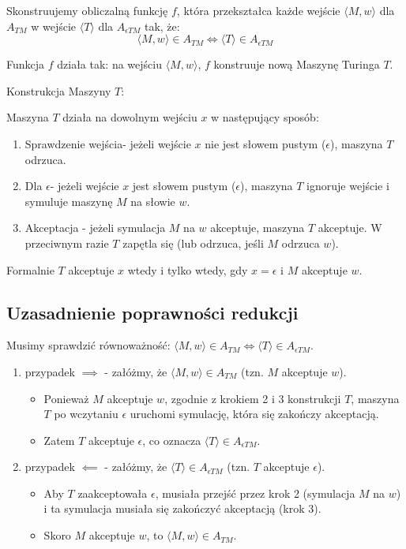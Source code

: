 \documentclass{article}
\begin{document}
Skonstruujemy obliczalną funkcję $f$, która przekształca każde wejście $\langle M, w \rangle$ dla $A_{TM}$ w wejście $\langle T \rangle$ dla $A_{\epsilon TM}$ tak, że:
$$
\langle M, w \rangle \in A_{TM} \iff \langle T \rangle \in A_{\epsilon TM}
$$

Funkcja $f$ działa tak: na wejściu $\langle M, w \rangle$, $f$ konstruuje nową Maszynę Turinga $T$.

Konstrukcja Maszyny $T$:

Maszyna $T$ działa na dowolnym wejściu $x$ w następujący sposób:
\begin{enumerate}
    \item Sprawdzenie wejścia- jeżeli wejście $x$ nie jest słowem pustym ($\epsilon$), maszyna $T$ odrzuca.
    \item Dla $\epsilon$- jeżeli wejście $x$ jest słowem pustym ($\epsilon$), maszyna $T$ ignoruje wejście i symuluje maszynę $M$ na słowie $w$.
    \item Akceptacja - jeżeli symulacja $M$ na $w$ akceptuje, maszyna $T$ akceptuje. W przeciwnym razie $T$ zapętla się (lub odrzuca, jeśli $M$ odrzuca $w$).
\end{enumerate}
Formalnie $T$ akceptuje $x$ wtedy i tylko wtedy, gdy $x=\epsilon$ i $M$ akceptuje $w$.

\subsection*{Uzasadnienie poprawności redukcji}

Musimy sprawdzić równoważność: $\langle M, w \rangle \in A_{TM} \iff \langle T \rangle \in A_{\epsilon TM}$.

\begin{enumerate}
    \item przypadek $\implies$ - załóżmy, że $\langle M, w \rangle \in A_{TM}$ (tzn. $M$ akceptuje $w$).
    \begin{itemize}
        \item Ponieważ $M$ akceptuje $w$, zgodnie z krokiem 2 i 3 konstrukcji $T$, maszyna $T$ po wczytaniu $\epsilon$ uruchomi symulację, która się zakończy akceptacją.
        \item Zatem $T$ akceptuje $\epsilon$, co oznacza $\langle T \rangle \in A_{\epsilon TM}$.
    \end{itemize}

    \item przypadek $\impliedby$ - załóżmy, że $\langle T \rangle \in A_{\epsilon TM}$ (tzn. $T$ akceptuje $\epsilon$).
    \begin{itemize}
        \item Aby $T$ zaakceptowała $\epsilon$, musiała przejść przez krok 2 (symulacja $M$ na $w$) i ta symulacja musiała się zakończyć akceptacją (krok 3).
        \item Skoro $M$ akceptuje $w$, to $\langle M, w \rangle \in A_{TM}$.
    \end{itemize}
\end{enumerate}
\end{document}
